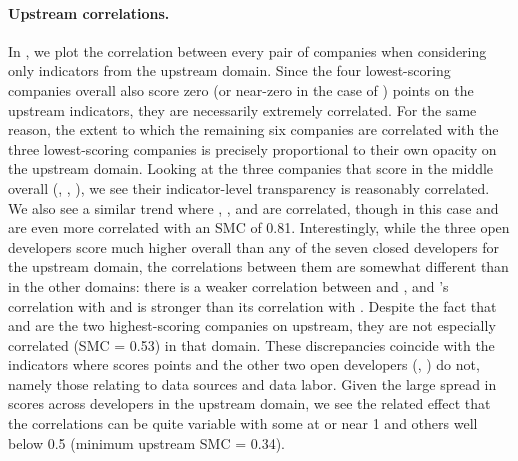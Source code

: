 \paragraph{Upstream correlations.}
In , we plot the correlation between every pair of companies when considering only indicators from the upstream domain.
Since the four lowest-scoring companies overall also score zero (or near-zero in the case of \cohere) points on the upstream indicators, they are necessarily extremely correlated.
For the same reason, the extent to which the remaining six companies are correlated with the three lowest-scoring companies is precisely proportional to their own opacity on the upstream domain.
Looking at the three companies that score in the middle overall (\google, \anthropic, \cohere), we see their indicator-level transparency is reasonably correlated.
We also see a similar trend where \openai, \google, and \anthropic are correlated, though in this case \openai and \cohere are even more correlated with an SMC of 0.81.
Interestingly, while the three open developers score much higher overall than any of the seven closed developers for the upstream domain, the correlations between them are somewhat different than in the other domains: there is a weaker correlation between \huggingface and \stability, and \meta's correlation with \openai and \stability is stronger than its correlation with \huggingface.
Despite the fact that \meta and \huggingface are the two highest-scoring companies on upstream, they are not especially correlated (SMC = 0.53) in that domain.
These discrepancies coincide with the indicators where \huggingface scores points and the other two open developers (\meta, \stability) do not, namely those relating to data sources and data labor. 
Given the large spread in scores across developers in the upstream domain, we see the related effect that the correlations can be quite variable with some at or near 1 and others well below 0.5 (minimum upstream SMC = 0.34).


